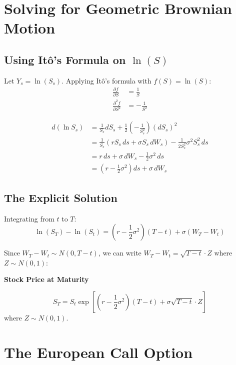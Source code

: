 \documentclass[11pt,a4paper]{article}
\newenvironment{keybox}[1][Key Result]
{\begin{leftbar}\noindent\textbf{\color{theoremblue}#1}\par\vspace{0.5em}}
{\end{leftbar}}
\begin{document}
\section{Solving for Geometric Brownian Motion}

\subsection{Using Itô's Formula on $\ln(S)$}

Let $Y_s = \ln(S_s)$. Applying Itô's formula with $f(S) = \ln(S)$:
\begin{align}
\frac{\partial f}{\partial S} &= \frac{1}{S}\\
\frac{\partial^2 f}{\partial S^2} &= -\frac{1}{S^2}
\end{align}

\begin{align}
d(\ln S_s) &= \frac{1}{S_s}dS_s + \frac{1}{2}\left(-\frac{1}{S_s^2}\right)(dS_s)^2\\
&= \frac{1}{S_s}(rS_s \, ds + \sigma S_s \, dW_s) - \frac{1}{2S_s^2}\sigma^2 S_s^2 \, ds\\
&= r \, ds + \sigma \, dW_s - \frac{1}{2}\sigma^2 \, ds\\
&= \left(r - \frac{1}{2}\sigma^2\right)ds + \sigma \, dW_s
\end{align}

\subsection{The Explicit Solution}

Integrating from $t$ to $T$:
\begin{equation}
\ln(S_T) - \ln(S_t) = \left(r - \frac{1}{2}\sigma^2\right)(T-t) + \sigma(W_T - W_t)
\end{equation}

Since $W_T - W_t \sim N(0, T-t)$, we can write $W_T - W_t = \sqrt{T-t} \cdot Z$ where $Z \sim N(0,1)$:

\begin{keybox}[Stock Price at Maturity]
\begin{equation}
S_T = S_t \exp\left[\left(r - \frac{1}{2}\sigma^2\right)(T-t) + \sigma\sqrt{T-t} \cdot Z\right]
\end{equation}
where $Z \sim N(0,1)$.
\end{keybox}

\section{The European Call Option}
\end{document}
